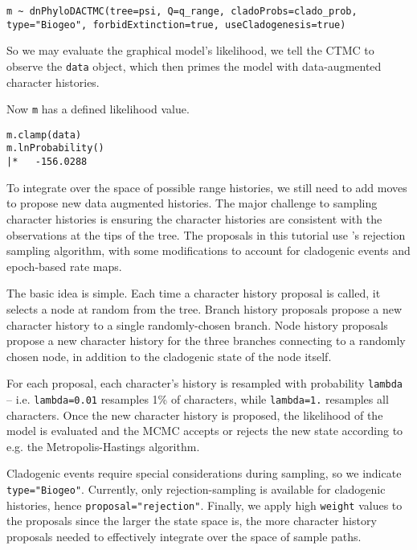 \begin{snugshade}
\begin{lstlisting}
m ~ dnPhyloDACTMC(tree=psi, Q=q_range, cladoProbs=clado_prob, type="Biogeo", forbidExtinction=true, useCladogenesis=true)
\end{lstlisting}
\end{snugshade}


So we may evaluate the graphical model's likelihood, we tell the CTMC to observe the {\tt data} object, which then primes the model with data-augmented character histories.

Now {\tt m} has a defined likelihood value.
\begin{snugshade}
\begin{lstlisting}
m.clamp(data)
m.lnProbability()
|*   -156.0288
\end{lstlisting}
\end{snugshade}

To integrate over the space of possible range histories, we still need to add moves to propose new data augmented histories.
The major challenge to sampling character histories is ensuring the character histories are consistent with the observations at the tips of the tree.
The proposals in this tutorial use \citet{nielsen02}'s rejection sampling algorithm, with some modifications to account for cladogenic events and epoch-based rate maps.

The basic idea is simple.
Each time a character history proposal is called, it selects a node at random from the tree.
Branch history proposals propose a new character history to a single randomly-chosen branch.
Node history proposals propose a new character history for the three branches connecting to a randomly chosen node, in addition to the cladogenic state of the node itself.

For each proposal, each character's history is resampled with probability {\tt lambda} -- i.e. {\tt lambda=0.01} resamples 1\% of characters, while {\tt lambda=1.} resamples all characters.
Once the new character history is proposed, the likelihood of the model is evaluated and the MCMC accepts or rejects the new state according to e.g. the Metropolis-Hastings algorithm.

Cladogenic events require special considerations during sampling, so we indicate {\tt type="Biogeo"}.
Currently, only rejection-sampling is available for cladogenic histories, hence {\tt proposal="rejection"}. Finally, we apply high {\tt weight} values to the proposals since the larger the state space is, the more character history proposals needed to effectively integrate over the space of sample paths.

